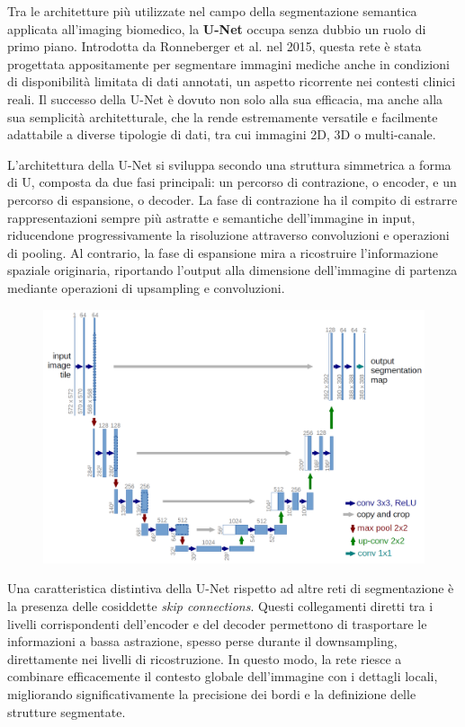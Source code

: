
Tra le architetture più utilizzate nel campo della segmentazione semantica applicata all’imaging biomedico, la \textbf{U-Net} occupa senza dubbio un ruolo di primo piano. Introdotta da Ronneberger et al. nel 2015, questa rete è stata progettata appositamente per segmentare immagini mediche anche in condizioni di disponibilità limitata di dati annotati, un aspetto ricorrente nei contesti clinici reali. Il successo della U-Net è dovuto non solo alla sua efficacia, ma anche alla sua semplicità architetturale, che la rende estremamente versatile e facilmente adattabile a diverse tipologie di dati, tra cui immagini 2D, 3D o multi-canale.

L'architettura della U-Net si sviluppa secondo una struttura simmetrica a forma di U, composta da due fasi principali: un percorso di contrazione, o encoder, e un percorso di espansione, o decoder. La fase di contrazione ha il compito di estrarre rappresentazioni sempre più astratte e semantiche dell’immagine in input, riducendone progressivamente la risoluzione attraverso convoluzioni e operazioni di pooling. Al contrario, la fase di espansione mira a ricostruire l’informazione spaziale originaria, riportando l’output alla dimensione dell’immagine di partenza mediante operazioni di upsampling e convoluzioni.

\begin{figure}[H]
  	\centering 
 	\includegraphics[width=.6\textwidth]{figures/U-Net-architecture.png} 
    \label{fig:Schema concettuale dell'architettura U-Net}
 \end{figure} 

Una caratteristica distintiva della U-Net rispetto ad altre reti di segmentazione è la presenza delle cosiddette \textit{skip connections}. Questi collegamenti diretti tra i livelli corrispondenti dell’encoder e del decoder permettono di trasportare le informazioni a bassa astrazione, spesso perse durante il downsampling, direttamente nei livelli di ricostruzione. In questo modo, la rete riesce a combinare efficacemente il contesto globale dell’immagine con i dettagli locali, migliorando significativamente la precisione dei bordi e la definizione delle strutture segmentate.

